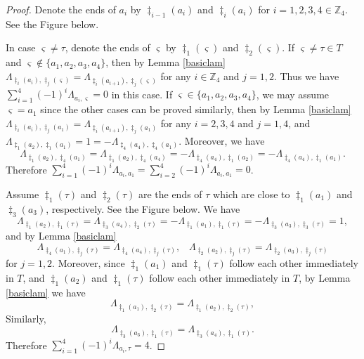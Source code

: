 \documentclass[10pt]{amsart}
\theoremstyle{theorems}
\begin{document}
\begin{proof}

Denote the ends of $a_i$ by $\ddag_{i-1}(a_i)$ and $\ddag_{i}(a_i)$ for $i=1,2,3,4\in \mathbb Z_4$. See the Figure below.

In case $\varsigma\neq \tau$, denote the ends of $\varsigma$ by $\ddag_1(\varsigma)$ and $\ddag_2(\varsigma)$. If $\varsigma\neq \tau\in T$ and $\varsigma\notin\{a_1,a_2,a_3,a_4\}$, then by Lemma \ref{basiclam} $\Lambda_{\ddag_{i}(a_i),\ddag_j(\varsigma)}=\Lambda_{\ddag_{i}(a_{i+1}),\ddag_j(\varsigma)}$ for any $i\in \mathbb Z_4$ and $j=1,2$. Thus we have $\sum_{i=1}^{4}(-1)^{i}\Lambda_{a_i,\varsigma}=0$ in this case. If $\varsigma\in\{a_1,a_2,a_3,a_4\}$, we may assume $\varsigma=a_1$ since the other cases can be proved similarly, then by Lemma \ref{basiclam} $\Lambda_{\ddag_{i}(a_i),\ddag_j(a_1)}=\Lambda_{\ddag_{i}(a_{i+1}),\ddag_j(a_1)}$ for any $i=2,3,4$ and $j=1,4$, and $\Lambda_{\ddag_{1}(a_2),\ddag_1(a_1)}=1=-\Lambda_{\ddag_{4}(a_{4}),\ddag_4(a_1)}$. Moreover, we have
$$\Lambda_{\ddag_{1}(a_2),\ddag_4(a_1)}=\Lambda_{\ddag_{1}(a_2),\ddag_4(a_4)}=-\Lambda_{\ddag_{4}(a_4),\ddag_1(a_2)}=-\Lambda_{\ddag_{4}(a_{4}),\ddag_1(a_1)}.$$
Therefore $\sum_{i=1}^{4}(-1)^{i}\Lambda_{a_i,a_1}=\sum_{i=2}^{4}(-1)^{i}\Lambda_{a_i,a_1}=0$.

Assume $\ddag_1(\tau)$ and $\ddag_2(\tau)$ are the ends of $\tau$ which are close to $\ddag_1(a_1)$ and $\ddag_3(a_3)$, respectively. See the Figure below. We have
$$\Lambda_{\ddag_{1}(a_2),\ddag_1(\tau)}=\Lambda_{\ddag_{3}(a_4),\ddag_2(\tau)}=-\Lambda_{\ddag_{1}(a_1),\ddag_1(\tau)}=-\Lambda_{\ddag_{3}(a_3),\ddag_3(\tau)}=1,$$ and by Lemma \ref{basiclam}
$$\Lambda_{\ddag_{4}(a_{1}),\ddag_j(\tau)}=\Lambda_{\ddag_{4}(a_{4}),\ddag_j(\tau)},\;\;\;\Lambda_{\ddag_{2}(a_{2}),\ddag_j(\tau)}=\Lambda_{\ddag_{2}(a_{3}),\ddag_j(\tau)}$$ for $j=1,2$. Moreover, since $\ddag_{1}(a_{1})$ and $\ddag_{1}(\tau)$ follow each other immediately in $T$, and $\ddag_{1}(a_{2})$ and $\ddag_{1}(\tau)$ follow each other immediately in $T$, by Lemma \ref{basiclam} we have
$$\Lambda_{\ddag_{1}(a_{1}),\ddag_2(\tau)}=\Lambda_{\ddag_{1}(a_2),\ddag_2(\tau)},$$
Similarly, $$\Lambda_{\ddag_{3}(a_{3}),\ddag_1(\tau)}=\Lambda_{\ddag_{3}(a_4),\ddag_1(\tau)}.$$
Therefore $\sum_{i=1}^{4}(-1)^{i}\Lambda_{a_i,\tau}=4$.
\end{proof}
\end{document}
